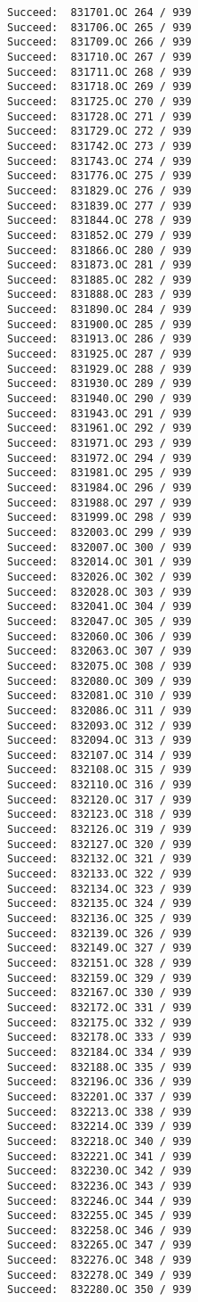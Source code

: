 \documentclass[11pt]{article}
\begin{document}
\begin{verbatim}
Succeed:  831701.OC 264 / 939
Succeed:  831706.OC 265 / 939
Succeed:  831709.OC 266 / 939
Succeed:  831710.OC 267 / 939
Succeed:  831711.OC 268 / 939
Succeed:  831718.OC 269 / 939
Succeed:  831725.OC 270 / 939
Succeed:  831728.OC 271 / 939
Succeed:  831729.OC 272 / 939
Succeed:  831742.OC 273 / 939
Succeed:  831743.OC 274 / 939
Succeed:  831776.OC 275 / 939
Succeed:  831829.OC 276 / 939
Succeed:  831839.OC 277 / 939
Succeed:  831844.OC 278 / 939
Succeed:  831852.OC 279 / 939
Succeed:  831866.OC 280 / 939
Succeed:  831873.OC 281 / 939
Succeed:  831885.OC 282 / 939
Succeed:  831888.OC 283 / 939
Succeed:  831890.OC 284 / 939
Succeed:  831900.OC 285 / 939
Succeed:  831913.OC 286 / 939
Succeed:  831925.OC 287 / 939
Succeed:  831929.OC 288 / 939
Succeed:  831930.OC 289 / 939
Succeed:  831940.OC 290 / 939
Succeed:  831943.OC 291 / 939
Succeed:  831961.OC 292 / 939
Succeed:  831971.OC 293 / 939
Succeed:  831972.OC 294 / 939
Succeed:  831981.OC 295 / 939
Succeed:  831984.OC 296 / 939
Succeed:  831988.OC 297 / 939
Succeed:  831999.OC 298 / 939
Succeed:  832003.OC 299 / 939
Succeed:  832007.OC 300 / 939
Succeed:  832014.OC 301 / 939
Succeed:  832026.OC 302 / 939
Succeed:  832028.OC 303 / 939
Succeed:  832041.OC 304 / 939
Succeed:  832047.OC 305 / 939
Succeed:  832060.OC 306 / 939
Succeed:  832063.OC 307 / 939
Succeed:  832075.OC 308 / 939
Succeed:  832080.OC 309 / 939
Succeed:  832081.OC 310 / 939
Succeed:  832086.OC 311 / 939
Succeed:  832093.OC 312 / 939
Succeed:  832094.OC 313 / 939
Succeed:  832107.OC 314 / 939
Succeed:  832108.OC 315 / 939
Succeed:  832110.OC 316 / 939
Succeed:  832120.OC 317 / 939
Succeed:  832123.OC 318 / 939
Succeed:  832126.OC 319 / 939
Succeed:  832127.OC 320 / 939
Succeed:  832132.OC 321 / 939
Succeed:  832133.OC 322 / 939
Succeed:  832134.OC 323 / 939
Succeed:  832135.OC 324 / 939
Succeed:  832136.OC 325 / 939
Succeed:  832139.OC 326 / 939
Succeed:  832149.OC 327 / 939
Succeed:  832151.OC 328 / 939
Succeed:  832159.OC 329 / 939
Succeed:  832167.OC 330 / 939
Succeed:  832172.OC 331 / 939
Succeed:  832175.OC 332 / 939
Succeed:  832178.OC 333 / 939
Succeed:  832184.OC 334 / 939
Succeed:  832188.OC 335 / 939
Succeed:  832196.OC 336 / 939
Succeed:  832201.OC 337 / 939
Succeed:  832213.OC 338 / 939
Succeed:  832214.OC 339 / 939
Succeed:  832218.OC 340 / 939
Succeed:  832221.OC 341 / 939
Succeed:  832230.OC 342 / 939
Succeed:  832236.OC 343 / 939
Succeed:  832246.OC 344 / 939
Succeed:  832255.OC 345 / 939
Succeed:  832258.OC 346 / 939
Succeed:  832265.OC 347 / 939
Succeed:  832276.OC 348 / 939
Succeed:  832278.OC 349 / 939
Succeed:  832280.OC 350 / 939

\end{verbatim}
\end{document}
